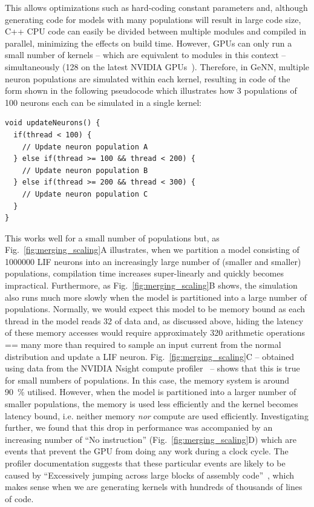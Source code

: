 \documentclass[9pt,twocolumn,twoside,lineno]{pnas-new}
\begin{document}
This allows optimizations such as hard-coding constant parameters and, although generating code for models with many populations will result in large code size, C++ CPU code can easily be divided between multiple modules and compiled in parallel, minimizing the effects on build time.
However, GPUs can only run a small number of kernels -- which are equivalent to modules in this context --  simultaneously (128 on the latest NVIDIA GPUs~\citep[p278]{NVIDIACorporation2019}).
Therefore, in GeNN, multiple neuron populations are simulated within each kernel, resulting in code of the form shown in the following pseudocode which illustrates how 3 populations of 100 neurons each can be simulated in a single kernel:
%
\begin{lstlisting}
void updateNeurons() {
  if(thread < 100) {
    // Update neuron population A
  } else if(thread >= 100 && thread < 200) {
    // Update neuron population B
  } else if(thread >= 200 && thread < 300) {
    // Update neuron population C
  }
}
\end{lstlisting}
%
This works well for a small number of populations but, as Fig.~\ref{fig:merging_scaling}A illustrates, when we partition a model consisting of \num{1000000} LIF neurons into an increasingly large number of (smaller and smaller) populations, compilation time increases super-linearly and quickly becomes impractical.
Furthermore, as Fig.~\ref{fig:merging_scaling}B shows, the simulation also runs much more slowly when the model is partitioned into a large number of populations.
Normally, we would expect this model to be memory bound as each thread in the model reads \SI{32}{\byte} of data and, as discussed above, hiding the latency of these memory accesses would require approximately 320 arithmetic operations == many more than required to sample an input current from the normal distribution and update a LIF neuron.
Fig.~\ref{fig:merging_scaling}C -- obtained using data from the NVIDIA Nsight compute profiler~\citep{NVIDIACorporation2020} -- shows that this is true for small numbers of populations.
In this case, the memory system is around \SI{90}{\percent} utilised.
However, when the model is partitioned into a larger number of smaller populations, the memory is used less efficiently and the kernel becomes latency bound, i.e. neither memory \emph{nor} compute are used efficiently.
Investigating further, we found that this drop in performance was accompanied by an increasing number of ``No instruction'' (Fig.~\ref{fig:merging_scaling}D) which are events that prevent the GPU from doing any work during a clock cycle. The profiler documentation suggests that these particular events are likely to be caused by ``Excessively jumping across large blocks of assembly code''~\citep[p47]{NVIDIACorporation2020}, which makes sense when we are generating kernels with hundreds of thousands of lines of code.
\end{document}
